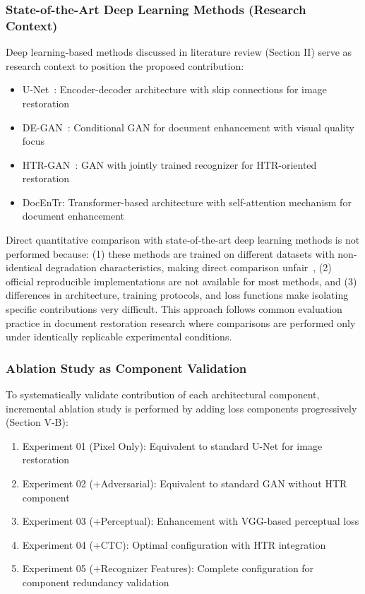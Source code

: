 \documentclass[journal]{IEEEtran}
\begin{document}
\subsubsection{State-of-the-Art Deep Learning Methods (Research Context)}

Deep learning-based methods discussed in literature review (Section II) serve as research context to position the proposed contribution:

\begin{itemize}
    \item U-Net~\cite{ronneberger2015unet}: Encoder-decoder architecture with skip connections for image restoration
    \item DE-GAN~\cite{souibgui2020degan}: Conditional GAN for document enhancement with visual quality focus
    \item HTR-GAN~\cite{souibgui2021enhance}: GAN with jointly trained recognizer for HTR-oriented restoration
    \item DocEnTr: Transformer-based architecture with self-attention mechanism for document enhancement
\end{itemize}

Direct quantitative comparison with state-of-the-art deep learning methods is not performed because: (1) these methods are trained on different datasets with non-identical degradation characteristics, making direct comparison unfair~\cite{tensmeyer2017document}, (2) official reproducible implementations are not available for most methods, and (3) differences in architecture, training protocols, and loss functions make isolating specific contributions very difficult. This approach follows common evaluation practice in document restoration research where comparisons are performed only under identically replicable experimental conditions.

\subsubsection{Ablation Study as Component Validation}

To systematically validate contribution of each architectural component, incremental ablation study is performed by adding loss components progressively (Section V-B):

\begin{enumerate}
    \item Experiment 01 (Pixel Only): Equivalent to standard U-Net for image restoration
    \item Experiment 02 (+Adversarial): Equivalent to standard GAN without HTR component
    \item Experiment 03 (+Perceptual): Enhancement with VGG-based perceptual loss
    \item Experiment 04 (+CTC): Optimal configuration with HTR integration
    \item Experiment 05 (+Recognizer Features): Complete configuration for component redundancy validation
\end{enumerate}
\end{document}
